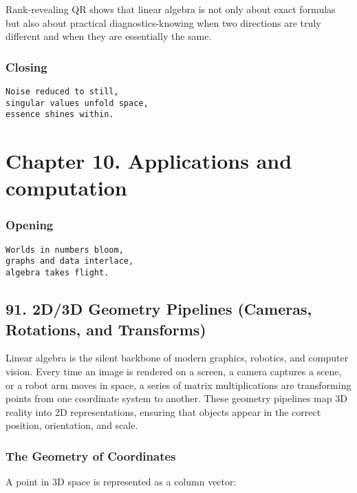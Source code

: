 \documentclass[
  letterpaper,
  DIV=11,
  numbers=noendperiod]{scrreprt}
\begin{document}
Rank-revealing QR shows that linear algebra is not only about exact
formulas but also about practical diagnostics-knowing when two
directions are truly different and when they are essentially the same.

\subsubsection{Closing}\label{closing-8}

\begin{verbatim}
Noise reduced to still,
singular values unfold space,
essence shines within.
\end{verbatim}

\section{Chapter 10. Applications and
computation}\label{chapter-10.-applications-and-computation-1}

\subsubsection{Opening}\label{opening-8}

\begin{verbatim}
Worlds in numbers bloom,
graphs and data interlace,
algebra takes flight.
\end{verbatim}

\subsection{91. 2D/3D Geometry Pipelines (Cameras, Rotations, and
Transforms)}\label{d3d-geometry-pipelines-cameras-rotations-and-transforms}

Linear algebra is the silent backbone of modern graphics, robotics, and
computer vision. Every time an image is rendered on a screen, a camera
captures a scene, or a robot arm moves in space, a series of matrix
multiplications are transforming points from one coordinate system to
another. These geometry pipelines map 3D reality into 2D
representations, ensuring that objects appear in the correct position,
orientation, and scale.

\subsubsection{The Geometry of
Coordinates}\label{the-geometry-of-coordinates}

A point in 3D space is represented as a column vector:
\end{document}
